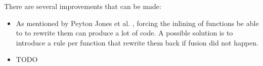 
There are several improvements that can be made:
\begin{itemize}
\item As mentioned by Peyton Jones et al. \cite{pbr}, forcing the inlining of functions be able to to rewrite them can produce a lot of code. A possible solution is to introduce a rule per function that rewrite them back if fusion did not happen.
\item TODO
\end{itemize}